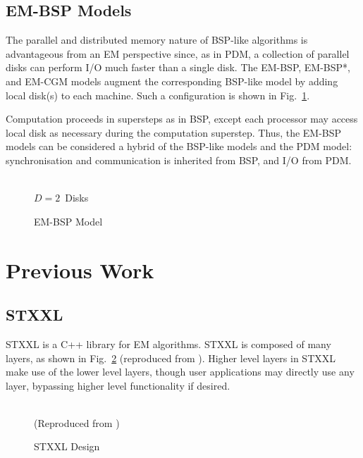 \documentclass[12pt]{carletoncsthesis}
\begin{document}
\subsection{EM-BSP Models}


The parallel and distributed memory nature of BSP-like algorithms is
advantageous from an EM perspective since, as in PDM, a collection of parallel
disks can perform I/O much faster than a single disk.  The EM-BSP, EM-BSP*,
and EM-CGM models \cite{dhthesis}\cite{emsimulation}\cite{bspem} augment
the corresponding BSP-like model by adding local disk(s) to each machine.
Such a configuration is shown in Fig.~\ref{pems1_model}.

Computation proceeds in supersteps as in BSP, except each processor may
access local disk as necessary during the computation superstep.  Thus,
the EM-BSP models can be considered a hybrid of the BSP-like models and
the PDM model: synchronisation and communication is inherited from BSP,
and I/O from PDM.

\begin{figure}[h]
\begin{center}
	 \\
$D=2$~Disks
\end{center}
\caption{EM-BSP Model}
\label{pems1_model}
\end{figure}


\section{Previous Work}


\subsection{STXXL}
\label{stxxl-sec}


STXXL is a C++ library for EM algorithms.  STXXL is composed of many layers, as
shown in Fig.~\ref{stxxl_layers} (reproduced from \cite{stxxl}).  Higher level
layers in STXXL make use of the lower level layers, though user applications
may directly use any layer, bypassing higher level functionality if desired.

\begin{figure}[ht]
\begin{center}
\\
(Reproduced from \cite{stxxl})
\end{center}
\caption{STXXL Design}
\label{stxxl_layers}
\end{figure}
\end{document}
